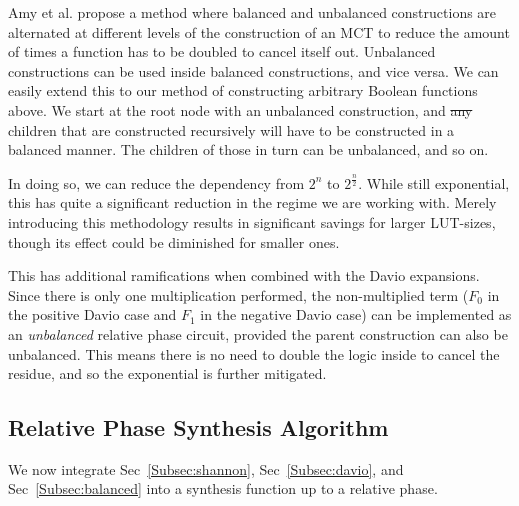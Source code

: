 \documentclass[paper]{ieice}
\providecommand{\DIFadd}[1]{{\protect\color{blue}{#1}}} %
\providecommand{\DIFdel}[1]{{\protect\color{red}\sout{#1}}}                      %
\providecommand{\DIFaddbegin}{} %
\providecommand{\DIFaddend}{} %
\providecommand{\DIFdelbegin}{} %
\providecommand{\DIFdelend}{} %
\newcommand{\DIFscaledelfig}{0.5}
\newlength{\DIFdelgraphicswidth} %
\newlength{\DIFdelgraphicsheight} %
\newcommand{\DIFaddincludegraphics}[2][]{{\color{blue}\fbox{\DIFOincludegraphics[#1]{#2}}}} %
\newcommand{\DIFdelincludegraphics}[2][]{%
\sbox{\DIFdelgraphicsbox}{\DIFOincludegraphics[#1]{#2}}%
\settoboxwidth{\DIFdelgraphicswidth}{\DIFdelgraphicsbox} %
\settoboxtotalheight{\DIFdelgraphicsheight}{\DIFdelgraphicsbox} %
\scalebox{\DIFscaledelfig}{%
\parbox[b]{\DIFdelgraphicswidth}{\usebox{\DIFdelgraphicsbox}\\[-\baselineskip] \rule{\DIFdelgraphicswidth}{0em}}\llap{\resizebox{\DIFdelgraphicswidth}{\DIFdelgraphicsheight}{%
\setlength{\unitlength}{\DIFdelgraphicswidth}%
\begin{picture}(1,1)%
\thicklines\linethickness{2pt} %
{\color[rgb]{1,0,0}\put(0,0){\framebox(1,1){}}}%
{\color[rgb]{1,0,0}\put(0,0){\line( 1,1){1}}}%
{\color[rgb]{1,0,0}\put(0,1){\line(1,-1){1}}}%
\end{picture}%
}\hspace*{3pt}}} %
} %
\DeclareRobustCommand{\DIFaddbegin}{\DIFOaddbegin \let\includegraphics\DIFaddincludegraphics} %
\DeclareRobustCommand{\DIFaddend}{\DIFOaddend \let\includegraphics\DIFOincludegraphics} %
\DeclareRobustCommand{\DIFdelbegin}{\DIFOdelbegin \let\includegraphics\DIFdelincludegraphics} %
\DeclareRobustCommand{\DIFdelend}{\DIFOaddend \let\includegraphics\DIFOincludegraphics} %
\begin{document}

\DIFaddend Amy et al. \DIFaddbegin \DIFadd{~\mbox{%
\cite{bib-amy-phase-state} }\hskip0pt%
}\DIFaddend propose a method where balanced and unbalanced constructions are alternated at different levels of the
construction of an MCT to reduce the amount of times a function has to be doubled to cancel itself out. 
Unbalanced constructions can be used inside balanced constructions,
and vice versa. We can easily extend this to our method of constructing arbitrary Boolean functions above. We start at the root node
with an unbalanced construction, and \DIFdelbegin \DIFdel{any }\DIFdelend \DIFaddbegin \DIFadd{its immediate }\DIFaddend children that are constructed recursively will have to be constructed
in a balanced manner. The children of those in turn can be unbalanced, and so on. 

In doing so, we can reduce the dependency from $2^n$ to $2^{\frac{n}{2}}$. While still exponential, this has quite
a significant reduction in the regime we are working with. Merely introducing this methodology results in significant savings for larger LUT-sizes, though
its effect could be diminished for smaller ones.

This has additional ramifications when combined with the Davio expansions. Since there is only one multiplication
performed, the non-multiplied term ($F_0$ in the positive Davio case and $F_1$ in the negative Davio case) can
be implemented as an \emph{unbalanced} relative phase circuit, provided the parent construction can also be
unbalanced. This means there is no need to double the logic inside to cancel the residue, and so the exponential
is further mitigated. 

\subsection{Relative Phase Synthesis Algorithm}
\label{Subsec:Pro:Improved}
We now integrate Sec~\ref{Subsec:shannon}, Sec~\ref{Subsec:davio}, and Sec~\ref{Subsec:balanced} into a synthesis function up to a relative phase.
\end{document}
